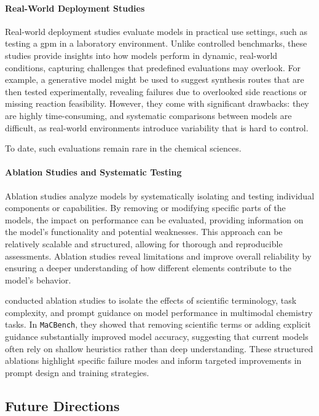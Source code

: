 \documentclass[11pt, oneside]{article}
\newcommand{\modelname}[1]{\texttt{#1}}
\providecommand{\DIFaddbegin}{} %
\providecommand{\DIFaddend}{} %
\providecommand{\DIFdelbegin}{} %
\providecommand{\DIFdelend}{} %
\newcommand{\DIFscaledelfig}{0.5}
\newlength{\DIFdelgraphicswidth} %
\newlength{\DIFdelgraphicsheight} %
\newcommand{\DIFaddincludegraphics}[2][]{{\color{blue}\fbox{\DIFOincludegraphics[#1]{#2}}}} %
\newcommand{\DIFdelincludegraphics}[2][]{%
\sbox{\DIFdelgraphicsbox}{\DIFOincludegraphics[#1]{#2}}%
\settoboxwidth{\DIFdelgraphicswidth}{\DIFdelgraphicsbox} %
\settoboxtotalheight{\DIFdelgraphicsheight}{\DIFdelgraphicsbox} %
\scalebox{\DIFscaledelfig}{%
\parbox[b]{\DIFdelgraphicswidth}{\usebox{\DIFdelgraphicsbox}\\[-\baselineskip] \rule{\DIFdelgraphicswidth}{0em}}\llap{\resizebox{\DIFdelgraphicswidth}{\DIFdelgraphicsheight}{%
\setlength{\unitlength}{\DIFdelgraphicswidth}%
\begin{picture}(1,1)%
\thicklines\linethickness{2pt} %
{\color[rgb]{1,0,0}\put(0,0){\framebox(1,1){}}}%
{\color[rgb]{1,0,0}\put(0,0){\line( 1,1){1}}}%
{\color[rgb]{1,0,0}\put(0,1){\line(1,-1){1}}}%
\end{picture}%
}\hspace*{3pt}}} %
} %
\DeclareRobustCommand{\DIFaddbegin}{\DIFOaddbegin \let\includegraphics\DIFaddincludegraphics} %
\DeclareRobustCommand{\DIFaddend}{\DIFOaddend \let\includegraphics\DIFOincludegraphics} %
\DeclareRobustCommand{\DIFdelbegin}{\DIFOdelbegin \let\includegraphics\DIFdelincludegraphics} %
\DeclareRobustCommand{\DIFdelend}{\DIFOaddend \let\includegraphics\DIFOincludegraphics} %
\begin{document}
\paragraph{Real-World Deployment Studies} 
Real-world deployment studies evaluate models in practical use settings, such as testing a \gls{gpm} in a laboratory environment.
\DIFdelbegin %
\DIFdelend Unlike controlled benchmarks, these studies provide insights into how models perform in dynamic, real-world conditions, capturing challenges that predefined evaluations may overlook. 
For example, a generative model might be used to suggest synthesis routes that are then tested experimentally, revealing failures due to overlooked side reactions or missing reaction feasibility. However, they come with significant drawbacks: they are highly time-consuming, and systematic comparisons between models are difficult, as real-world environments introduce variability that is hard to control. 

To date, such evaluations remain rare in the chemical sciences. 


\paragraph{Ablation Studies and Systematic Testing} 
Ablation studies analyze models by systematically isolating and testing individual components or capabilities. 
By removing or modifying specific parts of the models, the impact on performance can be evaluated, providing information on the model’s functionality and potential weaknesses. This approach can be relatively scalable and structured, allowing for thorough and reproducible assessments. Ablation studies reveal limitations and improve overall reliability by ensuring a deeper understanding of how different elements contribute to the model’s behavior. 

\textcite{alampara2024probing} conducted ablation studies to isolate the effects of scientific terminology, task complexity, and prompt guidance on model performance in multimodal chemistry tasks. 
In \modelname{MaCBench}, they showed that removing scientific terms or adding explicit guidance substantially improved model accuracy, suggesting that current models often rely on shallow heuristics rather than deep understanding. These structured ablations highlight specific failure modes and inform targeted improvements in prompt design and training strategies.

\subsection{Future Directions} \DIFaddbegin \label{sec:evals-future}
\DIFaddend 
\end{document}
